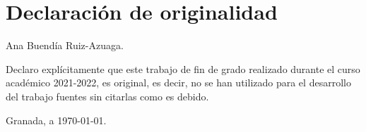 

\chapter*{Declaración de originalidad}

Ana Buendía Ruiz-Azuaga.

Declaro explícitamente que este trabajo de fin de grado realizado durante el curso académico 2021-2022, es original, es decir, no se han utilizado para el desarrollo del trabajo fuentes sin citarlas como es debido.

Granada, a \today.


